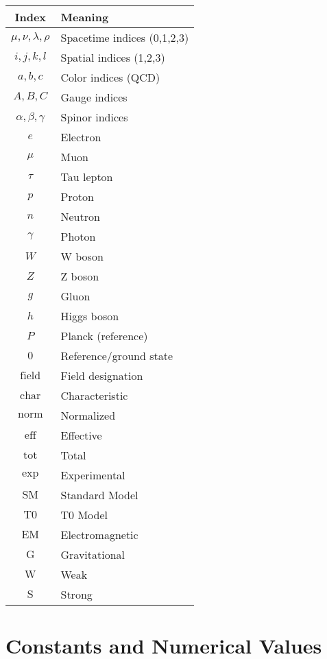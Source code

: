 \documentclass[12pt,a4paper]{report}
\begin{document}
\begin{longtable}{|c|l|}
	\hline
	\textbf{Index} & \textbf{Meaning} \\
	\hline
	$\mu, \nu, \lambda, \rho$ & Spacetime indices (0,1,2,3) \\
	$i, j, k, l$ & Spatial indices (1,2,3) \\
	$a, b, c$ & Color indices (QCD) \\
	$A, B, C$ & Gauge indices \\
	$\alpha, \beta, \gamma$ & Spinor indices \\
	$e$ & Electron \\
	$\mu$ & Muon \\
	$\tau$ & Tau lepton \\
	$p$ & Proton \\
	$n$ & Neutron \\
	$\gamma$ & Photon \\
	$W$ & W boson \\
	$Z$ & Z boson \\
	$g$ & Gluon \\
	$h$ & Higgs boson \\
	$P$ & Planck (reference) \\
	$0$ & Reference/ground state \\
	$\text{field}$ & Field designation \\
	$\text{char}$ & Characteristic \\
	$\text{norm}$ & Normalized \\
	$\text{eff}$ & Effective \\
	$\text{tot}$ & Total \\
	$\text{exp}$ & Experimental \\
	$\text{SM}$ & Standard Model \\
	$\text{T0}$ & T0 Model \\
	$\text{EM}$ & Electromagnetic \\
	$\text{G}$ & Gravitational \\
	$\text{W}$ & Weak \\
	$\text{S}$ & Strong \\
	\hline
\end{longtable}

\section{Constants and Numerical Values}
\label{sec:constants_values}
\end{document}
